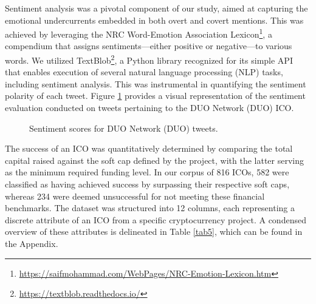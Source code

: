 \documentclass[runningheads]{llncs}
\begin{document}
Sentiment analysis was a pivotal component of our study, aimed at capturing the emotional undercurrents embedded in both overt and covert mentions. This was achieved by leveraging the NRC Word-Emotion Association Lexicon\footnote{\url{https://saifmohammad.com/WebPages/NRC-Emotion-Lexicon.htm}}, a compendium that assigns sentiments—either positive or negative—to various words. We utilized TextBlob\footnote{\url{https://textblob.readthedocs.io/}}, a Python library recognized for its simple API that enables execution of several natural language processing (NLP) tasks, including sentiment analysis. This was instrumental in quantifying the sentiment polarity of each tweet. Figure \ref{fig1} provides a visual representation of the sentiment evaluation conducted on tweets pertaining to the DUO Network (DUO) ICO.

\begin{figure}[htbp]
\centering
{}%
\caption{Sentiment scores for DUO Network (DUO) tweets.}
\label{fig1}
\end{figure}



The success of an ICO was quantitatively determined by comparing the total capital raised against the soft cap defined by the project, with the latter serving as the minimum required funding level. In our corpus of 816 ICOs, 582 were classified as having achieved success by surpassing their respective soft caps, whereas 234 were deemed unsuccessful for not meeting these financial benchmarks. The dataset was structured into 12 columns, each representing a discrete attribute of an ICO from a specific cryptocurrency project. A condensed overview of these attributes is delineated in Table \ref{tab5}, which can be found in the Appendix.
\end{document}

